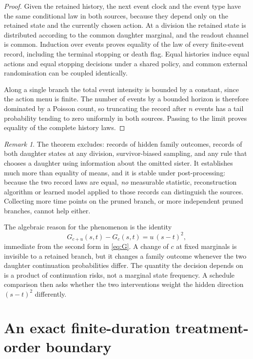 \documentclass[11pt]{article}
\theoremstyle{plain}
\theoremstyle{definition}
\theoremstyle{remark}
\newtheorem{remark}[theorem]{Remark}
\begin{document}
\begin{proof}
Given the retained history, the next event clock and the event type have the
same conditional law in both sources, because they depend only on the retained
state and the currently chosen action. At a division the retained state is
distributed according to the common daughter marginal, and the readout channel
is common. Induction over events proves equality of the law of every
finite-event record, including the terminal stopping or death flag. Equal
histories induce equal actions and equal stopping decisions under a shared
policy, and common external randomisation can be coupled identically.

Along a single branch the total event intensity is bounded by a constant, since
the action menu is finite. The number of events by a bounded horizon is
therefore dominated by a Poisson count, so truncating the record after $n$
events has a tail probability tending to zero uniformly in both sources.
Passing to the limit proves equality of the complete history laws.
\end{proof}

\begin{remark}
The theorem excludes: records of hidden family outcomes, records of both
daughter states at any division, survivor-biased sampling, and any rule that
chooses a daughter using information about the omitted sister. It establishes
much more than equality of means, and it is stable under post-processing:
because the two record laws are equal, \emph{no} measurable statistic,
reconstruction algorithm or learned model applied to those records can
distinguish the sources. Collecting more time points on the pruned branch, or
more independent pruned branches, cannot help either.
\end{remark}

The algebraic reason for the phenomenon is the identity
\begin{equation}\label{eq:square}
 G_{c+u}(s,t)-G_c(s,t)=u\,(s-t)^2 ,
\end{equation}
immediate from the second form in \eqref{eq:G}. A change of $c$ at fixed
marginals is invisible to a retained branch, but it changes a family outcome
whenever the two daughter continuation probabilities differ. The quantity the
decision depends on is a product of continuation risks, not a marginal state
frequency. A schedule comparison then asks whether the two interventions weight
the hidden direction $(s-t)^2$ differently.

\section{An exact finite-duration treatment-order boundary}\label{sec:boundary}
\end{document}

